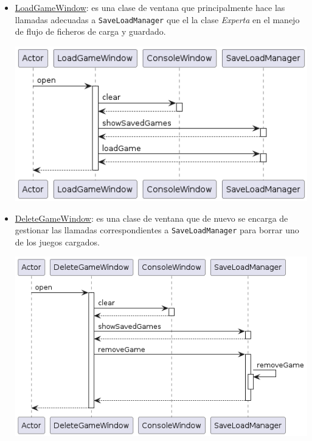\documentclass[../DocumentoOficial.tex]{subfiles}
\begin{document}
\begin{sprint}[5]
\begin{itemize}
\begin{center}
\end{center}

\item \underline{LoadGameWindow}: es una clase de ventana que principalmente hace las llamadas adecuadas a \texttt{SaveLoadManager} que el la clase \textit{Experta} en el manejo de flujo de ficheros de carga y guardado.
\begin{center}
\includegraphics[scale=0.5]{LoadGameWindow_sprint5_seq}
\end{center}

\item \underline{DeleteGameWindow}: es una clase de ventana que de nuevo se encarga de gestionar las llamadas correspondientes a \texttt{SaveLoadManager} para borrar uno de los juegos cargados.
\begin{center}
\includegraphics[scale=0.5]{DeleteGameWindow_sprint5_seq}
\end{center}
\end{itemize}


\end{sprint}
\end{document}
